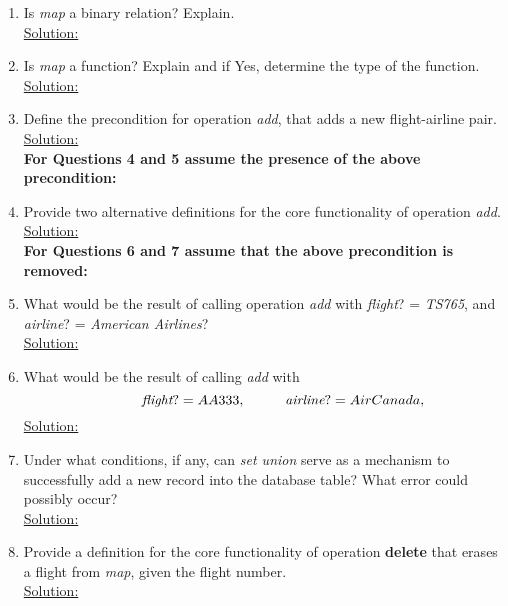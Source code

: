 \begin{enumerate}
  \item Is \emph{map} a binary relation? Explain.\\
  \noindent\underline{Solution:}\\
  \item Is \emph{map} a function? Explain and if Yes, determine the type of the function.\\
  \noindent\underline{Solution:}\\
  \item Define the precondition for operation \emph{add}, that adds a new flight-airline pair.\\
  \noindent\underline{Solution:}\\
  \textbf{For Questions 4 and 5 assume the presence of the above precondition:}\\
  \item Provide two alternative definitions for the core functionality of operation \emph{add}.\\
  \noindent\underline{Solution:}\\
  \textbf{For Questions 6 and 7 assume that the above precondition is removed:}\\
  \item What would be the result of calling operation \emph{add} with \emph{flight}? = \emph{TS765}, and \emph{airline}? = \emph{American Airlines}?\\
  \noindent\underline{Solution:}\\
  \item What would be the result of calling \emph{add} with\
  \[
  \hspace{10mm} \emph{flight}? = AA333,\\
  \hspace{10mm} \emph{airline}? = Air Canada,
  \]
  \noindent\underline{Solution:}\\
  \item Under what conditions, if any, can \emph{set union} serve as a mechanism to successfully add a new record into the database table? What error could possibly occur?\\
  \noindent\underline{Solution:}\\
  \item Provide a definition for the core functionality of operation \textbf{delete} that erases a flight from \emph{map}, given the flight number.\\
  \noindent\underline{Solution:}\\

  
  


\end{enumerate}